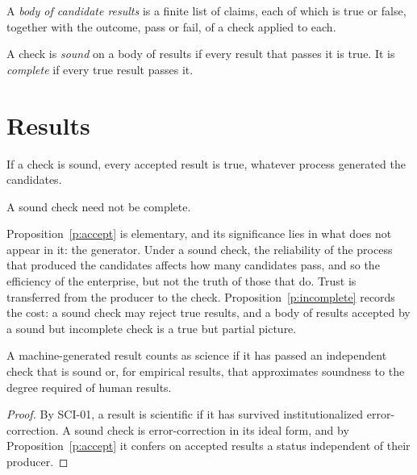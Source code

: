 \documentclass{situationist-preprint}
\begin{document}
\begin{definition}\label{d:result}
A \emph{body of candidate results} is a finite list of claims, each of which is true or false, together with the outcome, pass or fail, of a check applied to each.
\end{definition}

\begin{definition}\label{d:sound}
A check is \emph{sound} on a body of results if every result that passes it is true. It is \emph{complete} if every true result passes it.
\end{definition}

\section{Results}

\begin{proposition}\label{p:accept}
If a check is sound, every accepted result is true, whatever process generated the candidates.
\end{proposition}

\begin{proposition}\label{p:incomplete}
A sound check need not be complete.
\end{proposition}

Proposition~\ref{p:accept} is elementary, and its significance lies in what does not appear in it: the generator. Under a sound check, the reliability of the process that produced the candidates affects how many candidates pass, and so the efficiency of the enterprise, but not the truth of those that do. Trust is transferred from the producer to the check. Proposition~\ref{p:incomplete} records the cost: a sound check may reject true results, and a body of results accepted by a sound but incomplete check is a true but partial picture.

\begin{theorem}\label{t:main}
A machine-generated result counts as science if it has passed an independent check that is sound or, for empirical results, that approximates soundness to the degree required of human results.
\end{theorem}

\begin{proof}
By SCI-01, a result is scientific if it has survived institutionalized error-correction. A sound check is error-correction in its ideal form, and by Proposition~\ref{p:accept} it confers on accepted results a status independent of their producer.
\end{proof}
\end{document}
